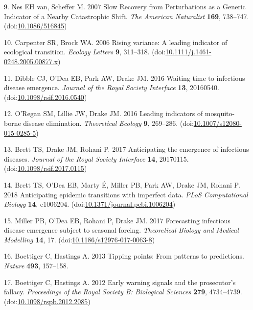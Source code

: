 \documentclass[3p]{elsarticle} %
\begin{document}
\leavevmode\hypertarget{ref-VanNes2007}{}%
9. Nes EH van, Scheffer M. 2007 Slow Recovery from Perturbations as a
Generic Indicator of a Nearby Catastrophic Shift. \emph{The American
Naturalist} \textbf{169}, 738--747.
(doi:\href{https://doi.org/10.1086/516845}{10.1086/516845})

\leavevmode\hypertarget{ref-Carpenter2006}{}%
10. Carpenter SR, Brock WA. 2006 Rising variance: A leading indicator of
ecological transition. \emph{Ecology Letters} \textbf{9}, 311--318.
(doi:\href{https://doi.org/10.1111/j.1461-0248.2005.00877.x}{10.1111/j.1461-0248.2005.00877.x})

\leavevmode\hypertarget{ref-Dibble2016}{}%
11. Dibble CJ, O'Dea EB, Park AW, Drake JM. 2016 Waiting time to
infectious disease emergence. \emph{Journal of the Royal Society
Interface} \textbf{13}, 20160540.
(doi:\href{https://doi.org/10.1098/rsif.2016.0540}{10.1098/rsif.2016.0540})

\leavevmode\hypertarget{ref-ORegan2016}{}%
12. O'Regan SM, Lillie JW, Drake JM. 2016 Leading indicators of
mosquito-borne disease elimination. \emph{Theoretical Ecology}
\textbf{9}, 269--286.
(doi:\href{https://doi.org/10.1007/s12080-015-0285-5}{10.1007/s12080-015-0285-5})

\leavevmode\hypertarget{ref-Brett2017}{}%
13. Brett TS, Drake JM, Rohani P. 2017 Anticipating the emergence of
infectious diseases. \emph{Journal of the Royal Society Interface}
\textbf{14}, 20170115.
(doi:\href{https://doi.org/10.1098/rsif.2017.0115}{10.1098/rsif.2017.0115})

\leavevmode\hypertarget{ref-Brett2018}{}%
14. Brett TS, O'Dea EB, Marty É, Miller PB, Park AW, Drake JM, Rohani P.
2018 Anticipating epidemic transitions with imperfect data. \emph{PLoS
Computational Biology} \textbf{14}, e1006204.
(doi:\href{https://doi.org/10.1371/journal.pcbi.1006204}{10.1371/journal.pcbi.1006204})

\leavevmode\hypertarget{ref-Miller2017}{}%
15. Miller PB, O'Dea EB, Rohani P, Drake JM. 2017 Forecasting infectious
disease emergence subject to seasonal forcing. \emph{Theoretical Biology
and Medical Modelling} \textbf{14}, 17.
(doi:\href{https://doi.org/10.1186/s12976-017-0063-8}{10.1186/s12976-017-0063-8})

\leavevmode\hypertarget{ref-Boettiger2013}{}%
16. Boettiger C, Hastings A. 2013 Tipping points: From patterns to
predictions. \emph{Nature} \textbf{493}, 157--158.

\leavevmode\hypertarget{ref-Boettiger2012a}{}%
17. Boettiger C, Hastings A. 2012 Early warning signals and the
prosecutor's fallacy. \emph{Proceedings of the Royal Society B:
Biological Sciences} \textbf{279}, 4734--4739.
(doi:\href{https://doi.org/10.1098/rspb.2012.2085}{10.1098/rspb.2012.2085})
\end{document}
